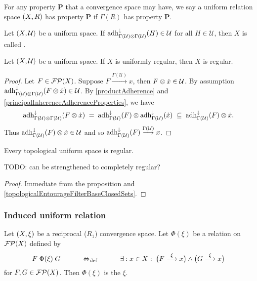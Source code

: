 \begin{definition}
For any property $\mathbf{P}$ that a convergence space may have, we say a uniform relation space $\sSet{X,R}$ has property $\mathbf{P}$ if $\Gamma(R)$ has property $\mathbf{P}$.
\end{definition}

\begin{definition}
Let $\sSet{X,\mathcal{U}}$ be a uniform space. If $\operatorname{adh}_{\Gamma(\mathcal{U})\otimes \Gamma(\mathcal{U})}^\downarrow(H) \in \mathcal{U}$ for all $H\in \mathcal{U}$, then $X$ is called .
\end{definition}

\begin{proposition}
Let $\sSet{X,\mathcal{U}}$ be a uniform space. If $X$ is uniformly regular, then $X$ is regular.
\end{proposition}
\begin{proof}
Let $F\in \operatorname{\mathcal{FP}}(X)$. Suppose $F\overset{\Gamma(\mathcal{U})}{\longrightarrow} x$, then $F\otimes \dot{x} \in \mathcal{U}$. By assumption $\operatorname{adh}_{\Gamma(\mathcal{U})\otimes \Gamma(\mathcal{U})}^\downarrow(F\otimes \dot{x}) \in \mathcal{U}$. By \ref{productAdherence} and \ref{principalInherenceAdherenceProperties}, we have
\[ \operatorname{adh}_{\Gamma(\mathcal{U})\otimes \Gamma(\mathcal{U})}^\downarrow(F\otimes \dot{x}) \; = \; \operatorname{adh}_{\Gamma(\mathcal{U})}^\downarrow(F)\otimes \operatorname{adh}_{\Gamma(\mathcal{U})}^\downarrow(\dot{x}) \; \subseteq \; \operatorname{adh}_{\Gamma(\mathcal{U})}^\downarrow(F)\otimes \dot{x}. \]
Thus $\operatorname{adh}_{\Gamma(\mathcal{U})}^\downarrow(F)\otimes \dot{x} \in\mathcal{U}$ and so $\operatorname{adh}_{\Gamma(\mathcal{U})}^\downarrow(F) \overset{\Gamma(\mathcal{U})}{\longrightarrow} x$.
\end{proof}
\begin{corollary} \label{topologicalUniformSpaceRegular}
Every topological uniform space is regular.
\end{corollary}
TODO: can be strengthened to completely regular?
\begin{proof}
Immediate from the proposition and \ref{topologicalEntourageFilterBaseClosedSets}.
\end{proof}

\subsubsection{Induced uniform relation}
\begin{definition}
Let $\sSet{X,\xi}$ be a reciprocal ($R_1$) convergence space. Let $\Phi(\xi)$ be a relation on $\operatorname{\mathcal{FP}}(X)$ defined by
\[ F\mathrel{\Phi(\xi)}G \qquad\quad\Leftrightarrow_{\text{def}}\quad\qquad \exists: x\in X: \; \big(F\overset{\xi}{\longrightarrow} x\big) \land \big(G\overset{\xi}{\longrightarrow} x\big) \]
for $F,G\in\operatorname{\mathcal{FP}}(X)$.
Then $\Phi(\xi)$ is the  $\xi$.
\end{definition}

